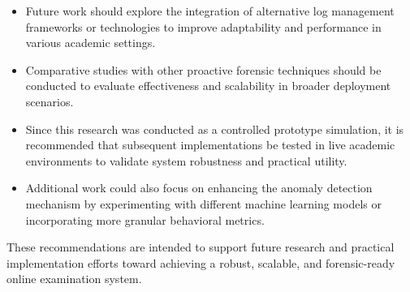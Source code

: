 \begin{itemize}
    \item Future work should explore the integration of alternative log management frameworks or technologies to improve adaptability and performance in various academic settings.
    \item Comparative studies with other proactive forensic techniques should be conducted to evaluate effectiveness and scalability in broader deployment scenarios.
    \item Since this research was conducted as a controlled prototype simulation, it is recommended that subsequent implementations be tested in live academic environments to validate system robustness and practical utility.
    \item Additional work could also focus on enhancing the anomaly detection mechanism by experimenting with different machine learning models or incorporating more granular behavioral metrics.
\end{itemize}

These recommendations are intended to support future research and practical implementation efforts toward achieving a robust, scalable, and forensic-ready online examination system.
